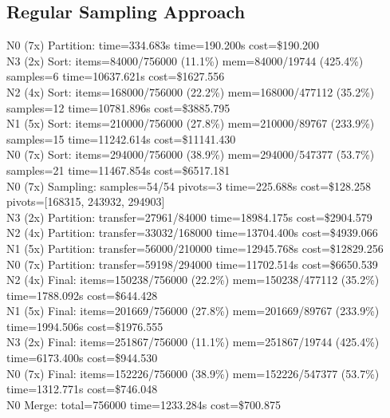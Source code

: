 \documentclass[]{interact}
\theoremstyle{plain}
\theoremstyle{definition}
\theoremstyle{remark}
\begin{document}
\subsection{Regular Sampling Approach}
N0 (7x) Partition: time=334.683\textmu s time=190.200\textmu s cost=\$190.200\\
N3 (2x) Sort: items=84000/756000 (11.1\%) mem=84000/19744 (425.4\%) samples=6 time=10637.621\textmu s cost=\$1627.556\\
N2 (4x) Sort: items=168000/756000 (22.2\%) mem=168000/477112 (35.2\%) samples=12 time=10781.896\textmu s cost=\$3885.795\\
N1 (5x) Sort: items=210000/756000 (27.8\%) mem=210000/89767 (233.9\%) samples=15 time=11242.614\textmu s cost=\$11141.430\\
N0 (7x) Sort: items=294000/756000 (38.9\%) mem=294000/547377 (53.7\%) samples=21 time=11467.854\textmu s cost=\$6517.181\\
N0 (7x) Sampling: samples=54/54 pivots=3 time=225.688\textmu s cost=\$128.258 pivots=[168315, 243932, 294903]\\
N3 (2x) Partition: transfer=27961/84000 time=18984.175\textmu s cost=\$2904.579\\
N2 (4x) Partition: transfer=33032/168000 time=13704.400\textmu s cost=\$4939.066\\
N1 (5x) Partition: transfer=56000/210000 time=12945.768\textmu s cost=\$12829.256\\
N0 (7x) Partition: transfer=59198/294000 time=11702.514\textmu s cost=\$6650.539\\
N2 (4x) Final: items=150238/756000 (22.2\%) mem=150238/477112 (35.2\%) time=1788.092\textmu s cost=\$644.428\\
N1 (5x) Final: items=201669/756000 (27.8\%) mem=201669/89767 (233.9\%) time=1994.506\textmu s cost=\$1976.555\\
N3 (2x) Final: items=251867/756000 (11.1\%) mem=251867/19744 (425.4\%) time=6173.400\textmu s cost=\$944.530\\
N0 (7x) Final: items=152226/756000 (38.9\%) mem=152226/547377 (53.7\%) time=1312.771\textmu s cost=\$746.048\\
N0 Merge: total=756000 time=1233.284\textmu s cost=\$700.875
\end{document}
